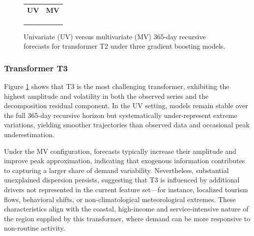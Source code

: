 \begin{figure}[!h]
\centering
\setlength{\tabcolsep}{3pt}
\renewcommand{\arraystretch}{1.0}
\begin{tabular}{cc}
\textbf{UV} & \textbf{MV} \\
 &
 \\
 &
 \\
 &
 \\
\end{tabular}
\caption{Univariate (UV) versus multivariate (MV) 365-day recursive forecasts for transformer T2 under three gradient boosting models.}
\label{fig:matrix_T2}
\end{figure}

\subsubsection{Transformer T3}
Figure \ref{fig:matrix_T2} shows that T3 is the most challenging transformer, exhibiting the highest amplitude and volatility in both the observed series and the decomposition residual component. In the UV setting, models remain stable over the full 365-day recursive horizon but systematically under-represent extreme variations, yielding smoother trajectories than observed data and occasional peak underestimation.

Under the MV configuration, forecasts typically increase their amplitude and improve peak approximation, indicating that exogenous information contributes to capturing a larger share of demand variability. Nevertheless, substantial unexplained dispersion persists, suggesting that T3 is influenced by additional drivers not represented in the current feature set---for instance, localized tourism flows, behavioral shifts, or non-climatological meteorological extremes. These characteristics align with the coastal, high-income and service-intensive nature of the region supplied by this transformer, where demand can be more responsive to non-routine activity.

